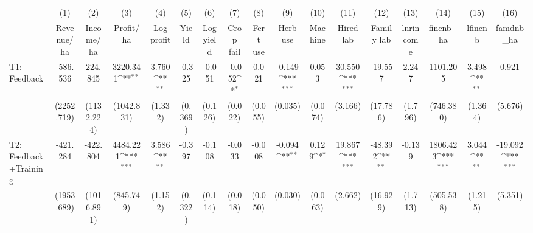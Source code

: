 {
\def\sym#1{\ifmmode^{#1}\else\(^{#1}\)\fi}
\begin{tabular}{l*{16}{c}}
\toprule
                    &\multicolumn{1}{c}{(1)}&\multicolumn{1}{c}{(2)}&\multicolumn{1}{c}{(3)}&\multicolumn{1}{c}{(4)}&\multicolumn{1}{c}{(5)}&\multicolumn{1}{c}{(6)}&\multicolumn{1}{c}{(7)}&\multicolumn{1}{c}{(8)}&\multicolumn{1}{c}{(9)}&\multicolumn{1}{c}{(10)}&\multicolumn{1}{c}{(11)}&\multicolumn{1}{c}{(12)}&\multicolumn{1}{c}{(13)}&\multicolumn{1}{c}{(14)}&\multicolumn{1}{c}{(15)}&\multicolumn{1}{c}{(16)}\\
                    &\multicolumn{1}{c}{Revenue/ha}&\multicolumn{1}{c}{Income/ha}&\multicolumn{1}{c}{Profit/ha}&\multicolumn{1}{c}{Log profit}&\multicolumn{1}{c}{Yield}&\multicolumn{1}{c}{Log yield}&\multicolumn{1}{c}{Crop fail}&\multicolumn{1}{c}{Fert use}&\multicolumn{1}{c}{Herb use}&\multicolumn{1}{c}{Machine}&\multicolumn{1}{c}{Hired lab}&\multicolumn{1}{c}{Family lab}&\multicolumn{1}{c}{lnrincome}&\multicolumn{1}{c}{fincnb\_ha}&\multicolumn{1}{c}{lfincnb}&\multicolumn{1}{c}{famdnb\_ha}\\
\midrule
T1: Feedback        &    -586.536         &     224.845         &    3220.341\sym{**} &       3.760\sym{**} &      -0.325         &      -0.051         &      -0.052\sym{*}  &       0.021         &      -0.149\sym{***}&       0.053         &      30.550\sym{***}&     -19.557         &       2.247         &    1101.205         &       3.498\sym{**} &       0.921         \\
                    &  (2252.719)         &  (1132.224)         &  (1042.831)         &     (1.332)         &     (0.369)         &     (0.126)         &     (0.022)         &     (0.055)         &     (0.035)         &     (0.074)         &     (3.166)         &    (17.786)         &     (1.796)         &   (746.380)         &     (1.364)         &     (5.676)         \\
T2: Feedback+Training&    -421.284         &    -422.804         &    4484.221\sym{***}&       3.586\sym{**} &      -0.397         &      -0.108         &      -0.033         &      -0.008         &      -0.094\sym{**} &       0.129\sym{*}  &      19.867\sym{***}&     -48.392\sym{**} &      -0.139         &    1806.423\sym{***}&       3.044\sym{**} &     -19.092\sym{***}\\
                    &  (1953.689)         &  (1016.891)         &   (845.749)         &     (1.152)         &     (0.322)         &     (0.114)         &     (0.018)         &     (0.050)         &     (0.030)         &     (0.063)         &     (2.662)         &    (16.929)         &     (1.713)         &   (505.538)         &     (1.215)         &     (5.351)         \\

\end{tabular}}
